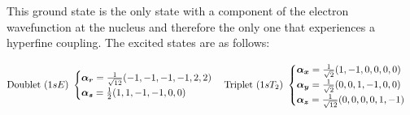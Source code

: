 This ground state is the only state with a component of the electron wavefunction at the nucleus and therefore the only one that experiences a hyperfine coupling. 
The excited states are as follows:

\begin{equation}
\text{Doublet  } (1sE) \text{  }
\begin{cases}
\bm{\alpha_r} = \frac{1}{\sqrt{12}}(-1, -1, -1, -1, 2, 2)\\
\bm{\alpha_s} = \frac{1}{2}(1, 1, -1, -1, 0, 0)\\
\end{cases}
\newline
\text{Triplet  } (1sT_2) \text{  } 
\begin{cases}
\bm{\alpha_x} = \frac{1}{\sqrt{2}}(1, -1, 0, 0, 0, 0)\\
\bm{\alpha_y} = \frac{1}{\sqrt{2}}(0, 0, 1, -1, 0, 0)\\
\bm{\alpha_z} = \frac{1}{\sqrt{12}}(0, 0, 0, 0, 1, -1)\\
\end{cases}
\end{equation}